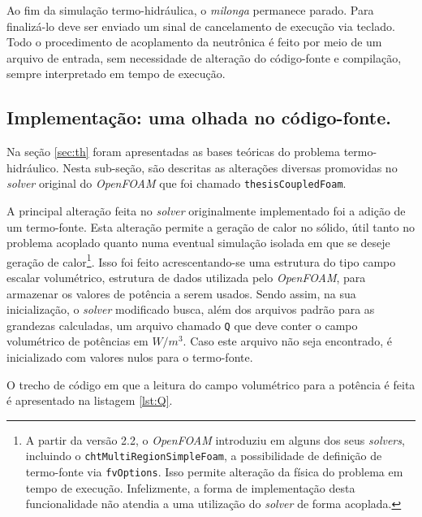 Ao fim da simulação termo-hidráulica, o \textit{milonga} permanece parado. Para finalizá-lo deve ser enviado um sinal de
cancelamento de execução via teclado. Todo o procedimento de acoplamento da neutrônica é feito por meio de um arquivo
de entrada, sem necessidade de alteração do código-fonte e compilação, sempre interpretado em tempo de execução.

\subsection{Implementação: uma olhada no código-fonte.}
\label{subsec:detth}
Na seção \ref{sec:th} foram apresentadas as bases teóricas do problema termo-hidráulico.
Nesta sub-seção, são
descritas as alterações diversas promovidas no \textit{solver} original do \textit{OpenFOAM}
que foi chamado \texttt{thesisCoupledFoam}.

A principal alteração feita no \textit{solver} originalmente implementado foi a adição de um termo-fonte.
Esta alteração permite a geração de calor no sólido, útil tanto no problema acoplado
quanto numa eventual simulação isolada em que se deseje geração de
calor\footnote{A partir da versão 2.2, o \textit{OpenFOAM} introduziu em alguns dos seus
\textit{solvers}, incluindo o \texttt{chtMultiRegionSimpleFoam}, a possibilidade de definição
de termo-fonte via \texttt{fvOptions}. Isso permite alteração da física do problema em
tempo de execução. Infelizmente, a forma de implementação desta funcionalidade não atendia a uma
utilização do \textit{solver} de forma acoplada.}. Isso foi feito acrescentando-se uma estrutura
do tipo campo escalar volumétrico, estrutura de dados utilizada pelo \textit{OpenFOAM},
para armazenar os valores de potência a serem usados. Sendo assim, na sua inicialização,
o \textit{solver} modificado busca, além dos arquivos padrão para as grandezas calculadas, um
arquivo chamado \texttt{Q} que deve conter o campo volumétrico de potências em $W/m^3$. Caso
este arquivo não seja encontrado, é inicializado com valores nulos para o termo-fonte.

O trecho de código em que a leitura do campo volumétrico para a potência é feita
é apresentado na listagem \ref{lst:Q}.

